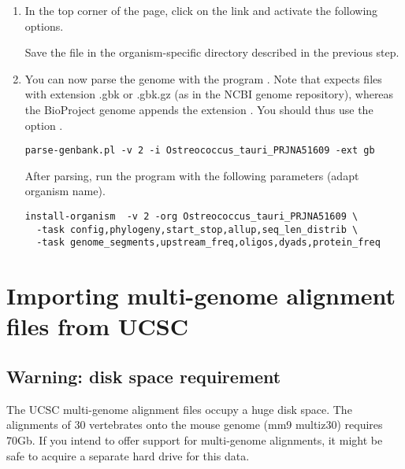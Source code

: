 \begin{enumerate}
\item In the top corner of the page, click on the 
  link and activate the following options.


  Save the file in the organism-specific directory described in the
  previous step.

\item You can now parse the genome with the program
  . Note that 
  expects files with extension .gbk or .gbk.gz (as in the NCBI genome
  repository), whereas the BioProject genome appends the extension
  . You should thus use the option .

\begin{lstlisting}
parse-genbank.pl -v 2 -i Ostreococcus_tauri_PRJNA51609 -ext gb
\end{lstlisting}

After parsing, run the program  with the
following parameters (adapt organism name).

\begin{lstlisting}
install-organism  -v 2 -org Ostreococcus_tauri_PRJNA51609 \
  -task config,phylogeny,start_stop,allup,seq_len_distrib \
  -task genome_segments,upstream_freq,oligos,dyads,protein_freq
\end{lstlisting}


\end{enumerate}


\section{Importing multi-genome alignment files from UCSC}


\subsection{Warning: disk space requirement}

The UCSC multi-genome alignment files occupy a huge disk space. The
alignments of 30 vertebrates onto the mouse genome (mm9 multiz30)
requires 70Gb. If you intend to offer support for multi-genome
alignments, it might be safe to acquire a separate hard drive for this
data.

